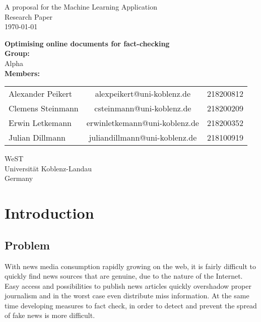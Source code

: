 \documentclass[10pt]{article}
\begin{document}
\begin{titlepage}
\begin{center}

A proposal for the Machine Learning Application\\
Research Paper\\
\vspace{4mm}
\today
\vspace{4mm}
\end{center}
\begin{center}
\textbf{\Large Optimising online documents for fact-checking}\\
\vspace{15mm}
\textbf{Group:}\\
\vspace{2mm}
Alpha \\
\vspace{15mm}
\textbf {Members:}\\
\vspace{2mm}

\begin{tabular}{ l c r }
  Alexander Peikert & alexpeikert@uni-koblenz.de & 218200812 \\
  Clemens Steinmann & csteinmann@uni-koblenz.de & 218200209 \\
  Erwin Letkemann & erwinletkemann@uni-koblenz.de & 218200352 \\
  Julian Dillmann & juliandillmann@uni-koblenz.de & 218100919 \\
\end{tabular}
\end{center}
\vfill
\begin{center}
\vspace{8mm}
WeST \\
Universität Koblenz-Landau \\
Germany \\
\vspace{2mm}
\end{center}
\clearpage
\end{titlepage}


\section{Introduction}
\subsection{Problem}
With news media consumption rapidly growing on the web, it is fairly difficult to quickly find news sources that are genuine, due to the nature of the Internet.
Easy access and possibilities to publish news articles quickly overshadow proper journalism and in the worst case even distribute miss information.
At the same time developing measures to fact check, in order to detect and prevent the spread of fake news is more difficult.
\end{document}
